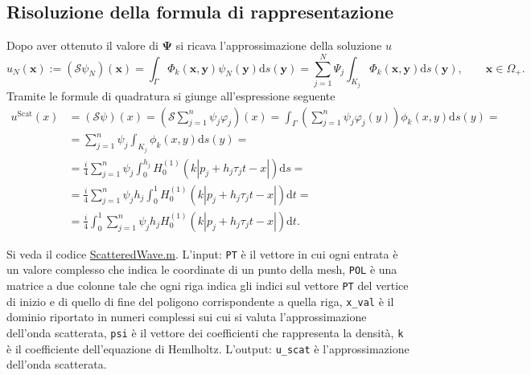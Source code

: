 \subsection{Risoluzione della formula di rappresentazione} \label{ScatteredWave}
Dopo aver ottenuto il valore di $\bm{\Psi}$ si ricava l'approssimazione della soluzione $u$
\begin{equation}
	u_N(\textbf{x}) := (\mathcal{S}\psi_N)(\textbf{x}) = \int_\Gamma \Phi_k(\textbf{x},\textbf{y}) \psi_N(\textbf{y}) \mathrm{d}s(\textbf{y}) = \sum_{j=1}^N \Psi_j \int_{K_j} \Phi_k(\textbf{x},\textbf{y}) \mathrm{d}s(\textbf{y}), \qquad \textbf{x} \in \Omega_+.
\end{equation}
Tramite le formule di quadratura si giunge all'espressione seguente
\begin{align*}
	u^{\text{Scat}}(x) &= (\mathcal{S}\psi)(x) = \left(\mathcal{S} \sum_{j=1}^n \psi_j \varphi_j \right) (x) = \int_{\Gamma} \left( \sum_{j=1}^n \psi_j \varphi_j (y) \right) \phi_k(x,y) \mathrm{d}s(y) = \\
	&= \sum_{j=1}^n \psi_j \int_{K_j} \phi_k(x,y) \mathrm{d}s(y) = \\
	&= \frac{i}{4} \sum_{j=1}^n \psi_j \int_0^{h_j} H_0^{(1)}(k|p_j + h_j\tau_jt -x|) \mathrm{d}s = \\
	&= \frac{i}{4} \sum_{j=1}^n \psi_j h_j \int_0^1 H^{(1)}_0 (k|p_j + h_j\tau_jt -x|) \mathrm{d}t = \\
	&= \frac{i}{4} \int_0^1 \sum_{j=1}^n \psi_j h_j H_0^{(1)} (k|p_j + h_j\tau_jt -x|) \mathrm{d}t.
\end{align*}

Si veda il codice \href{https://github.com/Daldossi/BEM/blob/main/ScatteredWave.m}{ScatteredWave.m}.
L'input: \verb|PT| è il vettore in cui ogni entrata è un valore complesso che indica le coordinate di un punto della mesh, \verb|POL| è una matrice a due colonne tale che ogni riga indica gli indici sul vettore \verb|PT| del vertice di inizio e di quello di fine del poligono corrispondente a quella riga, \verb|x_val| è il dominio riportato in numeri complessi sui cui si valuta l'approssimazione dell'onda scatterata, \verb|psi| è il vettore dei coefficienti che rappresenta la densità, \verb|k| è il coefficiente dell'equazione di Hemlholtz. L'output: \verb|u_scat| è l'approssimazione dell'onda scatterata.

